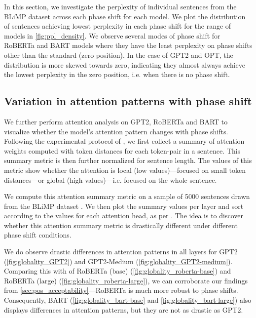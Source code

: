 \documentclass[letterpaper, 12pt]{report}
\begin{document}
In this section, we investigate the perplexity of individual sentences from the BLiMP dataset across each phase shift for each model. We plot the distribution of sentences achieving lowest perplexity in each phase shift for the range of models in \autoref{fig:ppl_density}. We observe several modes of phase shift for RoBERTa and BART models where they have the least perplexity on phase shifts other than the standard (zero position). In the case of GPT2 and OPT, the distribution is more skewed towards zero, indicating they almost always achieve the lowest perplexity in the zero position, i.e. when there is no phase shift.

\subsection{Variation in attention patterns with phase shift}
\label{sec:pos_attention_analysis}


We further perform attention analysis on GPT2, RoBERTa and BART to visualize whether the model's attention pattern changes with phase shifts. Following the experimental protocol of \citet{raghu2021vision}, we first collect a summary of attention weights computed with token distances for each token-pair in a sentence. This summary metric is then further normalized for sentence length. The values of this metric show whether the attention is local (low values)---focused on small token distances---or global (high values)---i.e. focused on the whole sentence.

We compute this attention summary metric on a sample of 5000 sentences drawn from the BLiMP dataset \cite{warstadt-etal-2020-blimp}. We then plot the summary values per layer and sort according to the values for each attention head, as per \citet{raghu2021vision}. The idea is to discover whether this attention summary metric is drastically different under different phase shift conditions. %

We do observe drastic differences in attention patterns in all layers for GPT2 (\autoref{fig:globality_GPT2}) and GPT2-Medium (\autoref{fig:globality_GPT2-medium}). Comparing this with of RoBERTa (base) (\autoref{fig:globality_roberta-base}) and RoBERTa (large) (\autoref{fig:globality_roberta-large}), we can corroborate our findings from \autoref{sec:pos_acceptability}---RoBERTa is much more robust to phase shifts. Consequently, BART (\autoref{fig:globality_bart-base} and \autoref{fig:globality_bart-large}) also displays differences in attention patterns, but they are not as drastic as GPT2.
\end{document}
